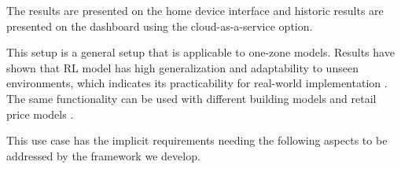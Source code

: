 The results are presented on the home device interface and historic results are presented on the dashboard using the cloud-as-a-service option.

This setup is a general setup that is applicable to one-zone models. Results have shown that RL model has high generalization and adaptability to unseen environments, which indicates its practicability for real-world implementation \cite{du2021intelligent}. The same functionality can be used with different building models and retail price models \cite{du2021intelligent}. 



This use case has the implicit requirements needing the following aspects to be addressed by the framework we develop.

